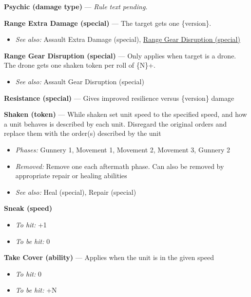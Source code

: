 \documentclass[a4paper,12pt]{article}
\begin{document}
\label{rule-damage-type-psychic}%
\noindent\textbf{Psychic (damage type)} --- \textit{Rule text pending.}

\label{rule-special-range-extra-damage}%
\noindent\textbf{Range Extra Damage (special)} --- The target gets one \{version\}.
\begin{itemize}
\item \textit{See also:} Assault Extra Damage (special), \hyperref[rule-special-range-gear-disruption]{Range Gear Disruption (special)}
\end{itemize}


\label{rule-special-range-gear-disruption}%
\noindent\textbf{Range Gear Disruption (special)} --- Only applies when target is a drone. The drone gets one shaken token per roll of \{N\}+.
\begin{itemize}
\item \textit{See also:} Assault Gear Disruption (special)
\end{itemize}


\label{rule-special-resistance}%
\noindent\textbf{Resistance (special)} --- Gives improved resilience versus \{version\} damage


\label{rule-token-shaken}%
\noindent\textbf{Shaken (token)} --- While shaken set unit speed to the specified speed, and how a unit behaves is described by each unit. Disregard the original orders and replace them with the order(s) described by the unit
\begin{itemize}
\item \textit{Phases:} Gunnery 1, Movement 1, Movement 2, Movement 3, Gunnery 2
\item \textit{Removed:} Remove one each aftermath phase. Can also be removed by appropriate repair or healing abilities
\item \textit{See also:} Heal (special), Repair (special)
\end{itemize}


\label{rule-speed-sneak}%
\noindent\textbf{Sneak (speed)}\begin{itemize}
\item \textit{To hit:} +1
\item \textit{To be hit:} 0
\end{itemize}


\label{rule-ability-take-cover}%
\noindent\textbf{Take Cover (ability)} --- Applies when the unit is in the given speed
\begin{itemize}
\item \textit{To hit:} 0
\item \textit{To be hit:} +N
\end{itemize}
\end{document}
